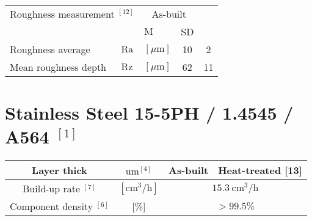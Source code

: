 \documentclass[10pt]{article}
\begin{document}
\begin{center}
\begin{tabular}{|l|ll|c|c|}
\hline
\multicolumn{2}{|l|}{Roughness measurement ${ }^{[12]}$} & \multicolumn{2}{|c|}{As-built} &  \\
\cline { 3 - 5 }
 &  & $\mathrm{M}$ & SD &  \\
\hline
Roughness average & $\mathrm{Ra}$ & $[\mu \mathrm{m}]$ & 10 & 2 \\
\hline
Mean roughness depth & $\mathrm{Rz}$ & $[\mu \mathrm{m}]$ & 62 & 11 \\
\hline
\end{tabular}
\end{center}

\section*{Stainless Steel 15-5PH / 1.4545 / A564 ${ }^{[1]}$}
\begin{center}
\begin{tabular}{|c|c|c|c|}
\hline
Layer thick & $\mathrm{um}^{[4]}$ & As-built & Heat-treated [13] \\
\hline
Build-up rate ${ }^{[7]}$ & $\left[\mathrm{cm}^{3} / \mathrm{h}\right]$ & \multicolumn{2}{|c|}{$15.3 \mathrm{~cm}^{3} / \mathrm{h}$} \\
\hline
Component density $^{[6]}$ & [\%] & \multicolumn{2}{|c|}{$>99.5 \%$} \\
\hline
\end{tabular}
\end{center}
\end{document}
